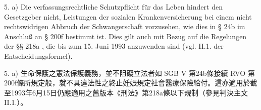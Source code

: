 \documentclass[12pt]{article}
\begin{document}
\begin{sourcepara}[title={原文E.228}]
5. a) Die verfassungsrechtliche Schutzpflicht für das Leben hindert den Gesetzgeber nicht, Leistungen der sozialen Krankenversicherung bei einem nicht rechtswidrigen Abbruch der Schwangerschaft vorzusehen, wie dies in § 24b \abbrSGBV{} im Anschluß an § 200f \abbrRVO{} bestimmt ist. Dies gilt auch mit Bezug auf die Regelungen der §§ 218a \abbrFF{} \abbrStGB{} \abbrAF{}, die bis zum 15. Juni 1993 anzuwenden sind (vgl. II.1. der Entscheidungsformel).
\end{sourcepara}
\begin{transpara}
5. a) 生命保護之憲法保護義務，並不阻礙立法者如 SGB V 第24b條接續 RVO 第200f條所規定般，就不具違法性之終止妊娠規定社會醫療保險給付。這亦適用於截至1993年6月15日仍應適用之舊版本《刑法》第218a條以下規制（參見判決主文 II.1.）。
\end{transpara}
\end{document}
